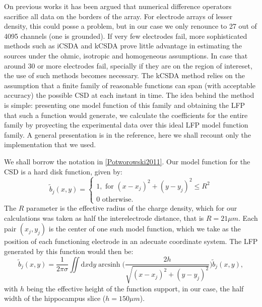 \documentclass{article}
\DeclareMathOperator{\arcsinh}{arcsinh}
\newcommand{\rd}{\mathrm{d}}
\begin{document}
On previous works it has been argued that numerical difference operators sacrifice all data on the borders of the array. For electrode arrays of lesser density, this could posse a problem, but in our case we only renounce to 27 out of 4095 channels (one is grounded). 
If very few electrodes fail, more sophisticated methods such as iCSDA \cite{Leski2011} and kCSDA \cite{Potworowski2011} prove little advantage in estimating the sources under the ohmic, isotropic and homogeneous assumptions. In case that around 30 or more electrodes
fail, specially if they are on the region of intereset, the use of such methods
becomes necessary. The kCSDA method relies on the
assumption that a finite family of reasonable functions can span (with acceptable accuracy) the possible CSD at each instant in time. The idea behind the method is simple:
presenting one model function of this family and obtaining the LFP that such a function
would generate, we calculate the coefficients for the entire family by proyecting the
experimental data over this ideal LFP model function family. A general presentation is in the reference, here
we shall recount only the implementation that we used.

We shall borrow the notation in \ref{Potworowski2011}. Our model function for the CSD is a hard disk function, given by:
\begin{equation}
  \tilde{b}_j(x,y)=\begin{cases}
  1, \text{ for } (x-x_j)^2+(y-y_j)^2 \leq R^2 \\
  0 \text{ otherwise.}
  \end{cases}
\end{equation}
The $R$ parameter is the effective radius of the charge density, which for our
calculations was taken as half the interelectrode distance, that is $R=21 \mu m$.
Each pair $(x_j, y_j)$ is the center of one such model function, which we take as
the position of each  functioning electrode in an adecuate coordinate system.
The LFP generated by this function would then be:
\begin{equation}
  \tilde{b}_j(x,y)=\frac{1}{2\pi\sigma}
  \iint \! \rd x \rd y \arcsinh \biggr(
  \frac{2 h } {\sqrt{(x-x_j)^2+(y-y_j)^2}}
  \biggl)
  \tilde{b}_j(x,y),
\end{equation}
  with $h$ being the effective height of the function support, in our case,
  the half width of the hippocampus slice ($h=150 \mu m$).
\end{document}
